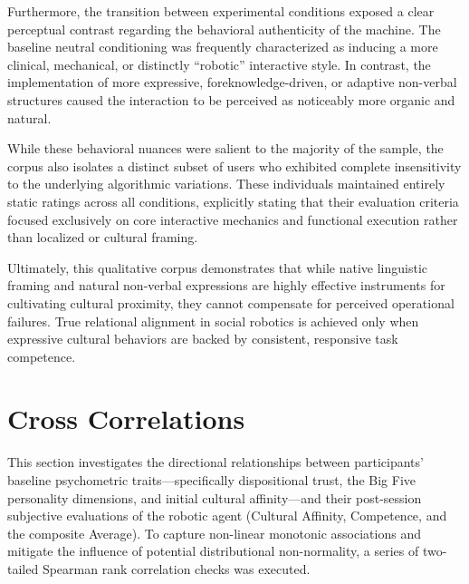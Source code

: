 Furthermore, the transition between experimental conditions exposed a clear perceptual contrast regarding the behavioral authenticity of the machine. 
The baseline neutral conditioning was frequently characterized as inducing a more clinical, mechanical, or distinctly ``robotic'' interactive style. 
In contrast, the implementation of more expressive, foreknowledge-driven, or adaptive non-verbal structures caused the interaction to be perceived as noticeably more organic and natural.

While these behavioral nuances were salient to the majority of the sample, the corpus also isolates a distinct subset of users who exhibited complete insensitivity to the underlying algorithmic variations. 
These individuals maintained entirely static ratings across all conditions, explicitly stating that their evaluation criteria focused exclusively on core interactive mechanics and functional execution rather than localized or cultural framing.

Ultimately, this qualitative corpus demonstrates that while native linguistic framing and natural non-verbal expressions are highly effective instruments for cultivating cultural proximity, they cannot compensate for perceived operational failures. 
True relational alignment in social robotics is achieved only when expressive cultural behaviors are backed by consistent, responsive task competence.

\section{Cross Correlations}
This section investigates the directional relationships between participants' baseline psychometric traits—specifically dispositional trust, the Big Five personality dimensions, and initial cultural affinity—and their post-session subjective evaluations of the robotic agent (Cultural Affinity, Competence, and the composite Average). 
To capture non-linear monotonic associations and mitigate the influence of potential distributional non-normality, a series of two-tailed Spearman rank correlation checks was executed. 

